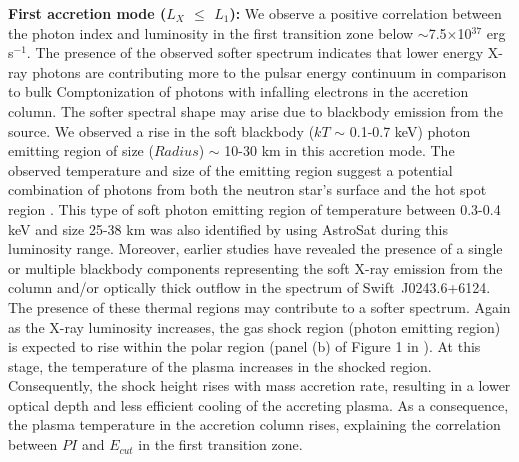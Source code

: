 \documentclass[twocolumn,trackchanges]{aastex631}
\begin{document}
{\bf First accretion mode ($L_{X}$ $\leq$ $L_{1}$):} We observe a positive correlation between the photon index and luminosity in the first transition zone below $\sim$7.5$\times$10$^{37}$  erg s$^{-1}$.  The presence of the observed softer spectrum indicates that lower energy X-ray photons are contributing more to the pulsar energy continuum in comparison to bulk Comptonization of photons with infalling electrons in the accretion column. The softer spectral shape may arise due to blackbody emission from the source. We observed a rise in the soft blackbody ($kT$ $\sim$ 0.1-0.7 keV) photon emitting region of size ($Radius$) $\sim$ 10-30 km in this accretion mode. The observed temperature and size of the emitting region suggest a potential combination of photons from both the neutron star's surface and the hot spot region \citep{2019MNRAS.488.4427Z, Elshamouty_2016}. This type of soft photon emitting region of temperature between 0.3-0.4 keV and size 25-38 km was also identified by \citealt{2021MNRAS.500..565B} using AstroSat during this luminosity range. Moreover, earlier studies have revealed the presence of a single \citep{2018MNRAS.474.4432J, 2020ApJ...902...18K} or multiple \citep{2019ApJ...873...19T} blackbody components representing the soft X-ray emission from the column and/or optically thick outflow in the spectrum of Swift~J0243.6+6124. The presence of these thermal regions may contribute to a softer spectrum. 
 Again as the X-ray luminosity increases, the gas shock region (photon emitting region) is expected to rise within the polar region (panel (b) of Figure 1 in \citealt{2012A&A...544A.123B}). At this stage, the temperature of the plasma increases in the shocked region. Consequently,  the shock height rises with mass accretion rate, resulting in a lower optical depth and less efficient cooling of the accreting plasma. As a consequence, the plasma temperature in the accretion column rises, explaining the correlation between $PI$  and $E_{cut}$  in the first transition zone.
\end{document}
